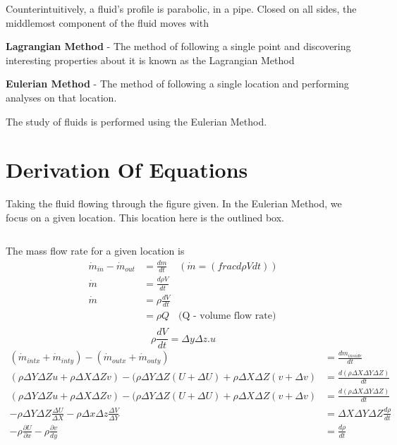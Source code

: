 \documentclass{report}
\begin{document}
Counterintuitively, a fluid's profile is parabolic, in a pipe. Closed on all sides, the middlemost component of the fluid moves with 

\begin{note}
\textbf{Lagrangian Method} -
The method of following a single point and discovering interesting properties about it is known as the Lagrangian Method

\textbf{Eulerian Method} -
The method of following a single location and performing analyses on that location.
\end{note}
The study of fluids is performed using the Eulerian Method. 

\section{Derivation Of Equations}
Taking the fluid flowing through the figure given. In the Eulerian Method, we focus on a given location. This location here is the outlined box. 

\[
\]

The mass flow rate for a given location is 
\begin{align*}
  \dot{m}_{in} - \dot{m}_{out} &= \frac{dm}{dt} &(\dot{m} = (frac{d \rho V}{dt})) \\
  \dot{m} &= \frac{d\rho V}{dt} \\
  \dot{m} &= \rho \frac{dV}{dt} \\
          &= \rho Q & \text{(Q - volume flow rate)} \\
\end{align*}
\[
  \rho \frac{dV}{dt} = \Delta y \Delta z . u
\]
\begin{align*}
  (\dot{m}_{intx} + \dot{m}_{inty}) - (\dot{m}_{outx} + \dot{m}_{outy}) &= \frac{dm_{inside}}{dt} \\
  (\rho \Delta Y \Delta Z u + \rho \Delta X \Delta Z v) - (\rho \Delta Y \Delta Z (U + \Delta U) + \rho \Delta X \Delta Z ( v + \Delta v) &= \frac{d(\rho \Delta X \Delta Y \Delta Z)}{dt} \\
  (\rho \Delta Y \Delta Z u + \rho \Delta X \Delta Z v) - (\rho \Delta Y \Delta Z (U + \Delta U) + \rho \Delta X \Delta Z ( v + \Delta v) &= \frac{d(\rho \Delta X \Delta Y \Delta Z)}{dt} \\
  - \rho \Delta Y \Delta Z \frac{\Delta U}{\Delta X} - \rho \Delta x \Delta z \frac{\Delta V}{\Delta Y} &= \Delta X \Delta Y \Delta Z \frac{d \rho}{dt} \\
  - \rho \frac{\partial U}{\partial x}  - \rho \frac{\partial v}{dy} &= \frac{d\rho}{dt} \\
\end{align*}
\end{document}
